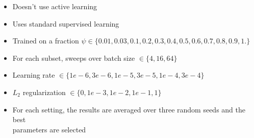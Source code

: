 \documentclass[preview]{standalone}
\begin{document}
\begin{center}
\begin{itemize}
                \item Doesn't use active learning
                \item Uses standard supervised learning
                \item Trained on a fraction $\psi \in \{0.01, 0.03, 0.1, 0.2, 0.3, 0.4, 0.5, 0.6, 0.7, 0.8, 0.9, 1.\}$
                \item For each subset, sweeps over batch size $\in \{4, 16, 64\}$
                \item Learning rate $\in \{1e-6, 3e-6, 1e-5, 3e-5, 1e-4, 3e-4\}$
                \item $L_2$ regularization $\in \{0, 1e-3, 1e-2, 1e-1, 1\}$
                \item For each setting, the results are averaged over three random seeds and the best \\ parameters are selected
            \end{itemize}
\end{center}
\end{document}
